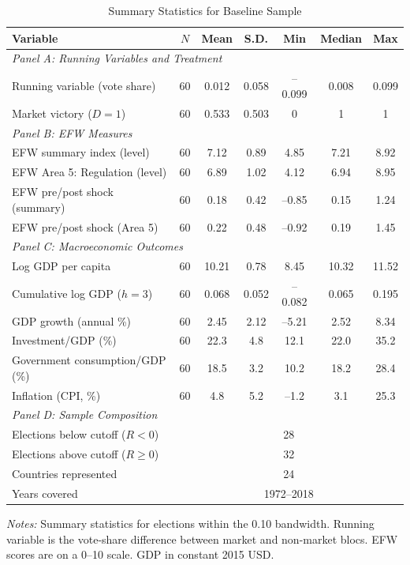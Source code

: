 \documentclass[12pt,a4paper]{article}
\begin{document}
\begin{table}[H]
\centering
\caption{Summary Statistics for Baseline Sample}
\label{tab:summary_stats}
\begin{threeparttable}
\begin{tabular}{lcccccc}
\toprule
Variable & $N$ & Mean & S.D. & Min & Median & Max \\
\midrule
\multicolumn{7}{l}{\textit{Panel A: Running Variables and Treatment}} \\
Running variable (vote share) & 60 & 0.012 & 0.058 & --0.099 & 0.008 & 0.099 \\
Market victory ($D = 1$) & 60 & 0.533 & 0.503 & 0 & 1 & 1 \\
\midrule
\multicolumn{7}{l}{\textit{Panel B: EFW Measures}} \\
EFW summary index (level) & 60 & 7.12 & 0.89 & 4.85 & 7.21 & 8.92 \\
EFW Area 5: Regulation (level) & 60 & 6.89 & 1.02 & 4.12 & 6.94 & 8.95 \\
EFW pre/post shock (summary) & 60 & 0.18 & 0.42 & --0.85 & 0.15 & 1.24 \\
EFW pre/post shock (Area 5) & 60 & 0.22 & 0.48 & --0.92 & 0.19 & 1.45 \\
\midrule
\multicolumn{7}{l}{\textit{Panel C: Macroeconomic Outcomes}} \\
Log GDP per capita & 60 & 10.21 & 0.78 & 8.45 & 10.32 & 11.52 \\
Cumulative log GDP ($h = 3$) & 60 & 0.068 & 0.052 & --0.082 & 0.065 & 0.195 \\
GDP growth (annual \%) & 60 & 2.45 & 2.12 & --5.21 & 2.52 & 8.34 \\
Investment/GDP (\%) & 60 & 22.3 & 4.8 & 12.1 & 22.0 & 35.2 \\
Government consumption/GDP (\%) & 60 & 18.5 & 3.2 & 10.2 & 18.2 & 28.4 \\
Inflation (CPI, \%) & 60 & 4.8 & 5.2 & --1.2 & 3.1 & 25.3 \\
\midrule
\multicolumn{7}{l}{\textit{Panel D: Sample Composition}} \\
Elections below cutoff ($R < 0$) & \multicolumn{6}{c}{28} \\
Elections above cutoff ($R \geq 0$) & \multicolumn{6}{c}{32} \\
Countries represented & \multicolumn{6}{c}{24} \\
Years covered & \multicolumn{6}{c}{1972--2018} \\
\bottomrule
\end{tabular}
\begin{tablenotes}
\small
\item \textit{Notes:} Summary statistics for elections within the 0.10 
bandwidth. Running variable is the vote-share difference between market 
and non-market blocs. EFW scores are on a 0--10 scale. GDP in constant 
2015 USD.
\end{tablenotes}
\end{threeparttable}
\end{table}
\end{document}
